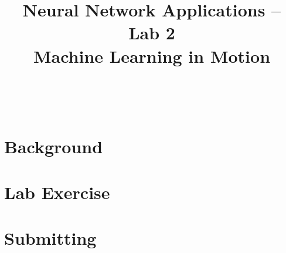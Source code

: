 \documentclass[11pt]{cselabheader}
\title{Neural Network Applications -- Lab 2 \\ Machine Learning in Motion}
\begin{document}
\maketitle

\horrule{0.5pt}\\\horrule{2pt}

\section{Background}

\section{Lab Exercise}

\section{Submitting}
\end{document}

